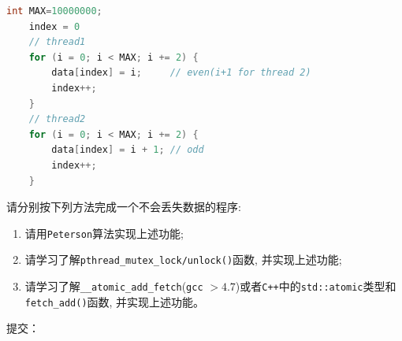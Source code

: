 \begin{lstlisting}[language=C]
    int MAX=10000000;
    index = 0
    // thread1
    for (i = 0; i < MAX; i += 2) {
        data[index] = i;     // even(i+1 for thread 2)
        index++;
    }
    // thread2
    for (i = 0; i < MAX; i += 2) {
        data[index] = i + 1; // odd
        index++;
    }
\end{lstlisting}

请分别按下列方法完成一个不会丢失数据的程序:
\begin{enumerate}
    \item 请用{\tt Peterson}算法实现上述功能;
    \item 请学习了解{\tt pthread_mutex_lock/unlock()}函数, 并实现上述功能;
    \item 请学习了解{\tt __atomic_add_fetch}({\tt gcc} $ > 4.7$)或者{\tt C++}中的{\tt std::atomic}类型和{\tt fetch_add()}函数, 并实现上述功能。
\end{enumerate}

提交：


